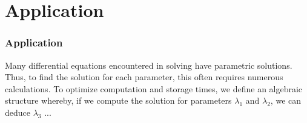 \documentclass[11pt]{beamer}
\begin{document}
\section{Application}
\begin{frame}
	\frametitle{Application}
	Many differential equations encountered 
	in solving have parametric solutions.
	 Thus, to find the solution for each 
	 parameter, this often requires 
	 numerous calculations. To optimize 
	 computation and storage times, we 
	 define an algebraic structure 
	 whereby, if we compute the solution 
	 for parameters $\lambda_1$ and $ \lambda_2 $,
	  we can deduce $\lambda_3$ ...

\end{frame}






\end{document}

